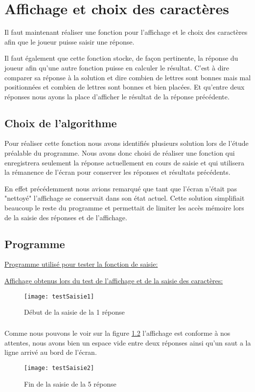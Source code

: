 \chapter{Affichage et choix des caractères}

	Il faut maintenant réaliser une fonction pour l'affichage et le choix des caractères afin que le joueur puisse saisir une réponse.
    
	Il faut également que cette fonction stocke, de façon pertinente, la réponse du joueur afin qu'une autre fonction puisse en calculer le résultat.
    C'est à dire comparer sa réponse à la solution et dire combien de lettres sont bonnes mais mal positionnées et combien de lettres sont bonnes et bien placées.
	Et qu'entre deux réponses nous ayons la place d'afficher le résultat de la réponse précédente.

\section{Choix de l'algorithme}
	Pour réaliser cette fonction nous avons identifiés plusieurs solution lors de l'étude préalable du programme. 
    Nous avons donc choisi de réaliser une fonction qui enregistrera seulement la réponse actuellement en cours de saisie et qui utilisera la rémanence de l'écran pour conserver les réponses et résultats précédents.
    
    En effet précédemment nous avions remarqué que tant que l'écran n'était pas "nettoyé" l'affichage se conservait dans son état actuel.
    Cette solution simplifiait beaucoup le reste du programme et permettait de limiter les accès mémoire lors de la saisie des réponses et de l'affichage.

\section{Programme}
\underline{Programme utilisé pour tester la fonction de saisie: }


\newpage
\underline{Affichage obtenus lors du test de l'affichage et de la saisie des caractères:}
\begin{figure}[h]
	\centering
   	\texttt{[image: testSaisie1]}
    \caption{Début de la saisie de la 1\iere{} réponse}
    \label{testSaisie1}
\end{figure}

\paragraph{}
Comme nous pouvons le voir sur la figure \ref{testSaisie2} l'affichage est conforme à nos attentes, nous avons bien un espace vide entre deux réponses ainsi qu'un saut a la ligne arrivé au bord de l'écran.
\begin{figure}[h]
	\centering
   	\texttt{[image: testSaisie2]}
    \caption{Fin de la saisie de la 5\ieme{} réponse}
    \label{testSaisie2}
\end{figure}